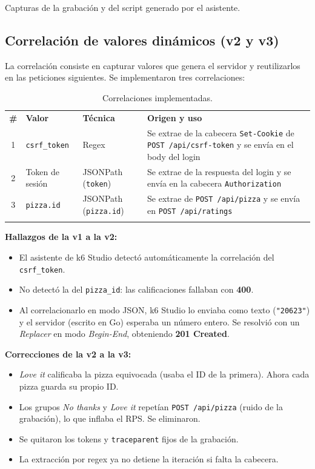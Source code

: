 \documentclass[11pt]{article}
\newcommand{\encab}[1]{{\leavevmode\color{white}\sffamily\bfseries #1}}
\renewcommand{\toprule}{\arrayrulecolor{ucbazul}\specialrule{0.8pt}{0pt}{0pt}\arrayrulecolor{black}}
\renewcommand{\midrule}{\arrayrulecolor{ucbazul}\specialrule{0.4pt}{0pt}{0pt}\arrayrulecolor{black}}
\renewcommand{\bottomrule}{\arrayrulecolor{acento}\specialrule{1.2pt}{0pt}{0pt}\arrayrulecolor{black}}
\begin{document}
\begin{pendiente}Capturas de la grabación y del script generado por el asistente.\end{pendiente}

\subsection{Correlación de valores dinámicos (v2 y v3)}

La correlación consiste en capturar valores que genera el servidor y reutilizarlos
en las peticiones siguientes. Se implementaron tres correlaciones:

\begin{table}[H]
\centering
\caption{Correlaciones implementadas.}
\begin{tabularx}{\textwidth}{c l l >{\raggedright\arraybackslash}X}
\toprule
\rowcolor{ucbazul}
\encab{\#} & \encab{Valor} & \encab{Técnica} & \encab{Origen y uso} \\
\midrule
1 & \texttt{csrf\_token} & Regex & Se extrae de la cabecera \texttt{Set-Cookie} de \texttt{POST /api/csrf-token} y se envía en el body del login \\
2 & Token de sesión & JSONPath (\texttt{token}) & Se extrae de la respuesta del login y se envía en la cabecera \texttt{Authorization} \\
3 & \texttt{pizza.id} & JSONPath (\texttt{pizza.id}) & Se extrae de \texttt{POST /api/pizza} y se envía en \texttt{POST /api/ratings} \\
\bottomrule
\end{tabularx}
\end{table}

\textbf{Hallazgos de la v1 a la v2:}
\begin{itemize}
  \item El asistente de k6 Studio detectó automáticamente la correlación del \texttt{csrf\_token}.
  \item No detectó la del \texttt{pizza\_id}: las calificaciones fallaban con \textbf{400}.
  \item Al correlacionarlo en modo JSON, k6 Studio lo enviaba como texto (\texttt{"20623"}) y el
        servidor (escrito en Go) esperaba un número entero. Se resolvió con un \emph{Replacer}
        en modo \emph{Begin-End}, obteniendo \textbf{201 Created}.
\end{itemize}

\textbf{Correcciones de la v2 a la v3:}
\begin{itemize}
  \item \emph{Love it} calificaba la pizza equivocada (usaba el ID de la primera). Ahora cada pizza guarda su propio ID.
  \item Los grupos \emph{No thanks} y \emph{Love it} repetían \texttt{POST /api/pizza} (ruido de la grabación),
        lo que inflaba el RPS. Se eliminaron.
  \item Se quitaron los tokens y \texttt{traceparent} fijos de la grabación.
  \item La extracción por regex ya no detiene la iteración si falta la cabecera.
\end{itemize}
\end{document}
